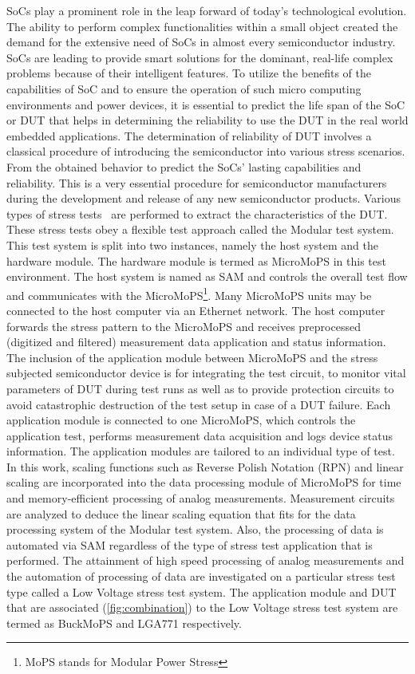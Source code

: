 \glspl{SoC} play a prominent role in the leap forward of today's technological evolution.
The ability to perform complex functionalities within a small object created the demand for the extensive need of \glspl{SoC} in almost every semiconductor industry.
\glspl{SoC} are leading to provide smart solutions for the dominant, real-life complex problems because of their intelligent features.
To utilize the benefits of the capabilities of \gls{SoC} and to ensure the operation of such micro computing environments and power devices, it is essential to predict the life span of the \gls{SoC} or \gls{DUT} that helps in determining the reliability to use the \gls{DUT} in the real world embedded applications. 
The determination of reliability of \gls{DUT} involves a classical procedure of introducing the semiconductor into various stress scenarios.
From the obtained behavior to predict the \glspl{SoC}' lasting capabilities and reliability.
This is a very essential procedure for semiconductor manufacturers during the development and release of any new semiconductor products. 
Various types of stress tests~\cite{Sleik2016} are performed to extract the characteristics of the \gls{DUT}. 
These stress tests obey a flexible test approach called the Modular test system.
This test system is split into two instances, namely the host system and the hardware module. 
The hardware module is termed as MicroMoPS in this test environment.
The host system is named as \gls{SAM} and controls the overall test flow and communicates with the MicroMoPS\footnote{MoPS stands for Modular Power Stress}.
Many MicroMoPS units may be connected to the host computer via an Ethernet network.
The host computer forwards the stress pattern to the MicroMoPS and receives preprocessed (digitized and filtered) measurement data application and status information.
The inclusion of the application module between MicroMoPS and the stress subjected semiconductor device is for integrating the test circuit, to monitor vital parameters of \gls{DUT} during test runs as well as to provide protection circuits to avoid catastrophic destruction of the test setup in case of a \gls{DUT} failure.
Each application module is connected to one MicroMoPS, which controls the application test, performs measurement data acquisition and logs device status information. 
The application modules are tailored to an individual type of test.
In this work, scaling functions such as Reverse Polish Notation (RPN) and linear scaling are incorporated into the data processing module of MicroMoPS for time and memory-efficient processing of analog measurements. Measurement circuits are analyzed to deduce the linear scaling equation that fits for the data processing system of the Modular test system. Also, the processing of data is automated via \gls{SAM} regardless of the type of stress test application that is performed. The attainment of high speed processing of analog measurements and the automation of processing of data are investigated on a particular stress test type called a Low Voltage stress test system. 
The application module and \gls{DUT} that are associated (\cref{fig:combination}) to the Low Voltage stress test system are termed as BuckMoPS and LGA771 respectively.  
    

